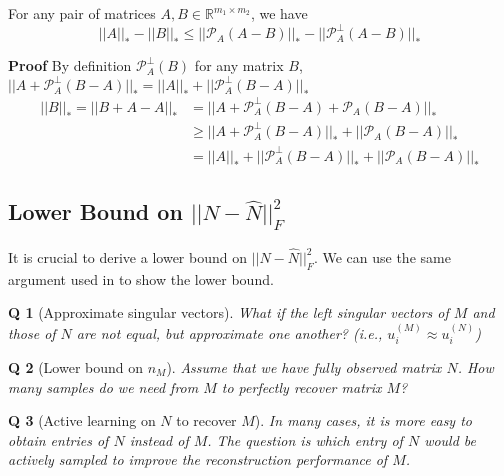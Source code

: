 \documentclass{article} %
\newtheorem{question}{Q}
\newcommand\mc{\mathcal} %
\begin{document}
\begin{lemma}\label{lmm:normdiff}For any pair of matrices $A, B \in \mathbb{R}^{m_1 \times m_2}$, we have
\begin{equation}
||A||_* - ||B||_* \leq ||\mc{P}_A(A-B)||_* - ||\mc{P}_A^\perp(A-B)||_*
\end{equation}
\end{lemma}
\textbf{Proof} By definition $\mc{P}_A^\perp(B)$ for any matrix $B$, $||A + \mc{P}_A^\perp(B-A)||_* = ||A||_* + ||\mc{P}_A^\perp(B-A)||_*$
\begin{align}
||B||_* = ||B + A - A||_* &= ||A + \mc{P}^\perp_A(B-A) + \mc{P}_A(B-A)||_*\\
&\geq ||A + \mc{P}^\perp_A(B-A)||_* + ||\mc{P}_A(B-A)||_*\\
&= ||A||_* + ||\mc{P}^\perp_A(B-A)||_* + ||\mc{P}_A(B-A)||_*
\end{align}


\subsection{Lower Bound on $||N-\hat{N}||_F^2$}

It is crucial to derive a lower bound on $||N-\hat{N}||_F^2$. We can use the same argument used in \cite{lafond2015low} to show the lower bound.


\begin{question}[Approximate singular vectors]
What if the left singular vectors of $M$ and those of $N$ are not equal, but approximate one another? (i.e., $u_i^{(M)} \approx u_i^{(N)}$)
\end{question}

\begin{question}[Lower bound on $n_M$]
Assume that we have fully observed matrix $N$. How many samples do we need from $M$ to perfectly recover matrix $M$?
\end{question}

\begin{question}[Active learning on $N$ to recover $M$]
In many cases, it is more easy to obtain entries of $N$ instead of $M$. The question is which entry of $N$ would be actively sampled to improve the reconstruction performance of $M$.
\end{question}
\end{document}
